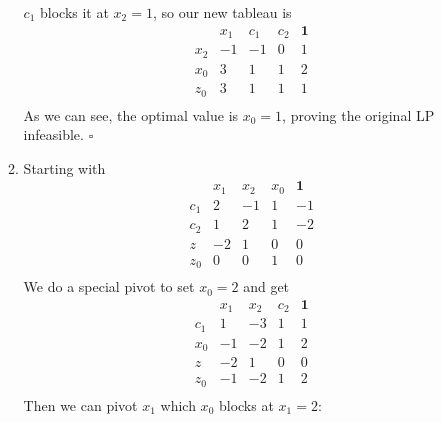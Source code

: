 \documentclass[12pt]{article}
\begin{document}
\begin{enumerate}
\begin{enumerate}
                        $c_1$ blocks it at $x_2=1$, so our new tableau is
                        \[\begin{array}{c|rrr|l}
                                        & x_1 & c_1 & c_2 & \mathbf{1} \\ \hline
                                    x_2 & -1  & -1  & 0   & 1          \\
                                    x_0 & 3   & 1   & 1   & 2          \\ \hline
                                    z_0 & 3   & 1   & 1   & 1          \\
                              \end{array}\]
                        As we can see, the optimal value is $x_0=1$, proving the original LP infeasible. $\square$
                  \item Starting with
                        \[\begin{array}{c|rrr|l}
                                        & x_1 & x_2 & x_0 & \mathbf{1} \\ \hline
                                    c_1 & 2   & -1  & 1   & -1         \\
                                    c_2 & 1   & 2   & 1   & -2         \\ \hline
                                    z   & -2  & 1   & 0   & 0          \\ \hline
                                    z_0 & 0   & 0   & 1   & 0          \\
                              \end{array}\]
                        We do a special pivot to set $x_0=2$ and get
                        \[\begin{array}{c|rrr|l}
                                        & x_1 & x_2 & c_2 & \mathbf{1} \\ \hline
                                    c_1 & 1   & -3  & 1   & 1          \\
                                    x_0 & -1  & -2  & 1   & 2          \\ \hline
                                    z   & -2  & 1   & 0   & 0          \\ \hline
                                    z_0 & -1  & -2  & 1   & 2          \\
                              \end{array}\]
                        Then we can pivot $x_1$ which $x_0$ blocks at $x_1=2$:
                        \[\begin{array}{c|rrr|l}

\end{array}\]
\end{enumerate}
\end{enumerate}
\end{document}
